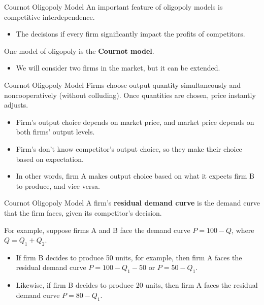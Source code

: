 \documentclass{beamer}
\begin{document}
\begin{frame}{Cournot Oligopoly Model}
  An important feature of oligopoly models is competitive interdependence.

  \begin{itemize}
    \item The decisions if every firm significantly impact the profits of competitors.
  \end{itemize}

  \bigskip
  One model of oligopoly is the \textbf{Cournot model}.

  \begin{itemize}
    \item We will consider two firms in the market, but it can be extended.
  \end{itemize}
\end{frame}

\begin{frame}{Cournot Oligopoly Model}
  Firms choose output quantity simultaneously and noncooperatively (without colluding). Once quantities are chosen, price instantly adjusts.

  \begin{itemize}
    \item Firm's output choice depends on market price, and market price depends on both firms' output levels.

    \item Firm's don't know competitor's output choice, so they make their choice based on expectation.
  
    \item In other words, firm A makes output choice based on what it expects firm B to produce, and vice versa.
  \end{itemize}
\end{frame}

\begin{frame}{Cournot Oligopoly Model}
  A firm's \textbf{residual demand curve} is the demand curve that the firm faces, given its competitor's decision.

  \bigskip 
  For example, suppose firms A and B face the demand curve $P=100-Q$, where $Q = Q_1 + Q_2$.
  \begin{itemize}
    \item If firm B decides to produce 50 units, for example, then firm A faces the residual demand curve $P = 100 - Q_1 - 50$ or $P = 50 - Q_1$.
    \item Likewise, if firm B decides to produce 20 units, then firm A faces the residual demand curve $P = 80 - Q_1$.
  \end{itemize}
\end{frame}
\end{document}
